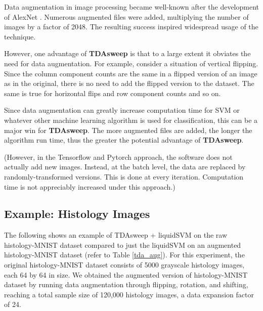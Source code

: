 \documentclass{article}
\begin{document}
Data augmentation in image processing became well-known after the development of AlexNet \cite{10.5555/2999134.2999257}. Numerous augmented files were added, multiplying the number of images by a factor of 2048. The resulting success inspired widespread usage of the technique.

However, one advantage of \textbf{TDAsweep} is that to a large extent it obviates the need for data augmentation. For example, consider a situation of vertical flipping. Since the column component counts are the same in a flipped version of an image as in the original, there is no need to add the flipped version to the dataset. The same is true for horizontal flips and row component counts and so on.

Since data augmentation can greatly increase computation time for SVM or whatever other machine learning algorithm is used for classification, this can be a major win for \textbf{TDAsweep}. The more augmented files are added, the longer the algorithm run time, thus the greater the potential advantage of \textbf{TDAsweep}.

(However, in the Tensorflow and Pytorch approach, the software does not actually add new images. Instead, at the batch level, the data are replaced by randomly-transformed versions. This is done at every iteration. Computation time is not appreciably increased under this approach.)

\subsection{Example: Histology Images}
The following shows an example of TDAsweep + liquidSVM on the raw histology-MNIST dataset compared to just the liquidSVM on an augmented histology-MNIST dataset (refer to Table \ref{tda_aug}). For this experiment, the original histology-MNIST dataset consists of 5000 grayscale histology images, each 64 by 64 in size. We obtained the augmented version of histology-MNIST dataset by running data augmentation through flipping, rotation, and shifting, reaching a total sample size of 120,000 histology images, a data expansion factor of 24.
\end{document}
